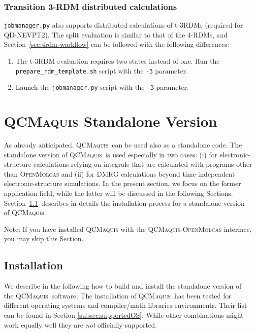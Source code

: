 \documentclass[bibliography=totoc,12pt,a4paper]{scrartcl}
\newcommand{\mol}{\textsc{OpenMolcas}}
\newcommand{\qcm}{\textsc{QCMaquis}}
\newcommand{\kwd}[1]{\texttt{#1}}
\begin{document}
\subsubsection{Transition 3-RDM distributed calculations}

\kwd{jobmanager.py} also supports distributed calculations of t-3RDMs (required for QD-NEVPT2). The split evaluation is similar to that of the 4-RDMs, and Section~\ref{sec:4rdm-workflow} can be followed with the following differences:
\begin{enumerate}
 \item The t-3RDM evaluation requires two states instead of one. Run the \\
 \kwd{prepare\_rdm\_template.sh} script with the \kwd{-3} parameter.
 \item Launch the \kwd{jobmanager.py} script with the \kwd{-3} parameter.
\end{enumerate}

\section{\qcm{} Standalone Version}

As already anticipated, \qcm\ can be used also as a standalone code.
The standalone version of \qcm\ is used especially in two cases: (i) for electronic-structure calculations relying on integrals that are calculated with programs other than \mol{} and (ii) for DMRG calculations beyond time-independent electronic-structure simulations.
In the present section, we focus on the former application field, while the latter will be discussed in the following Sections. \\
Section~\ref{sec:install-qcm-stand}\ describes in details the installation process for a standalone version of \qcm.

\begin{framed}
 \noindent Note: If you have installed \qcm{} with the \qcm{}-\mol{} interface, you may skip this Section.
\end{framed}

\subsection{Installation}
\label{sec:install-qcm-stand}

\noindent We describe in the following how to build and install the standalone version of the \qcm\ software.
The installation of \qcm\ has been tested for different operating systems and compiler/math libraries environments.
Their list can be found in Section \ref{subsec:supportedOS}.
While other combinations might work equally well they are \emph{not} officially supported.
\end{document}
